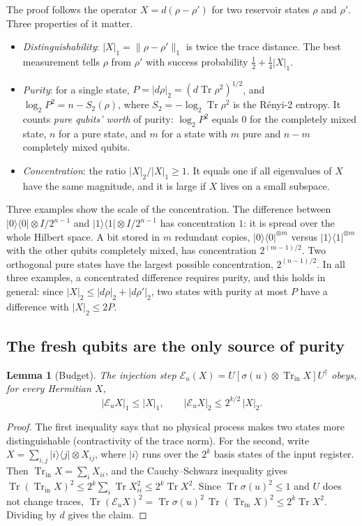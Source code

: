 \documentclass[aps,prl,twocolumn,superscriptaddress,floatfix]{revtex4-2}
\theoremstyle{plain}
\newtheorem{lemma}{Lemma}
\newcommand{\tr}{\operatorname{Tr}}
\newcommand{\ket}[1]{|#1\rangle}
\newcommand{\ketbra}[2]{|#1\rangle\!\langle #2|}
\newcommand{\nrm}[2]{\lvert #1\rvert_{#2}}
\newcommand{\Norm}[1]{\lVert #1\rVert}
\newcommand{\cE}{\mathcal E}
\begin{document}
The proof follows the operator $X=d(\rho-\rho')$ for two reservoir states $\rho$ and $\rho'$. Three properties of it matter.
\begin{itemize}
\item \emph{Distinguishability}: $\nrm X1=\Norm{\rho-\rho'}_1$ is twice the trace distance. The best measurement tells $\rho$ from $\rho'$ with success probability $\frac12+\frac14\nrm X1$.
\item \emph{Purity}: for a single state, $P=\nrm{d\rho}2=(d\tr\rho^2)^{1/2}$, and $\log_2P^2=n-S_2(\rho)$, where $S_2=-\log_2\tr\rho^2$ is the R\'enyi-2 entropy. It counts \emph{pure qubits' worth} of purity: $\log_2P^2$ equals $0$ for the completely mixed state, $n$ for a pure state, and $m$ for a state with $m$ pure and $n-m$ completely mixed qubits.
\item \emph{Concentration}: the ratio $\nrm X2/\nrm X1\ge1$. It equals one if all eigenvalues of $X$ have the same magnitude, and it is large if $X$ lives on a small subspace.
\end{itemize}
Three examples show the scale of the concentration. The difference between $\ketbra00\otimes I/2^{n-1}$ and $\ketbra11\otimes I/2^{n-1}$ has concentration $1$: it is spread over the whole Hilbert space. A bit stored in $m$ redundant copies, $\ketbra00^{\otimes m}$ versus $\ketbra11^{\otimes m}$ with the other qubits completely mixed, has concentration $2^{(m-1)/2}$. Two orthogonal pure states have the largest possible concentration, $2^{(n-1)/2}$. In all three examples, a concentrated difference requires purity, and this holds in general: since $\nrm X2\le\nrm{d\rho}2+\nrm{d\rho'}2$, two states with purity at most $P$ have a difference with $\nrm X2\le2P$.

\subsection{The fresh qubits are the only source of purity}

\begin{lemma}[Budget]\label{lem:norms}
The injection step $\cE_u(X)=U[\sigma(u)\otimes\tr_{\mathrm{in}}X]U^\dagger$ obeys, for every Hermitian $X$,
\begin{equation}
\nrm{\cE_uX}1\le\nrm X1,\qquad\nrm{\cE_uX}2\le2^{k/2}\,\nrm X2 .
\label{eq:S-norms}
\end{equation}
\end{lemma}

\begin{proof}
The first inequality says that no physical process makes two states more distinguishable (contractivity of the trace norm). For the second, write $X=\sum_{i,j}\ketbra ij\otimes X_{ij}$, where $\ket i$ runs over the $2^k$ basis states of the input register. Then $\tr_{\mathrm{in}}X=\sum_iX_{ii}$, and the Cauchy--Schwarz inequality gives $\tr(\tr_{\mathrm{in}}X)^2\le2^k\sum_i\tr X_{ii}^2\le2^k\tr X^2$. Since $\tr\sigma(u)^2\le1$ and $U$ does not change traces, $\tr(\cE_uX)^2=\tr\sigma(u)^2\,\tr(\tr_{\mathrm{in}}X)^2\le2^k\tr X^2$. Dividing by $d$ gives the claim.
\end{proof}
\end{document}
